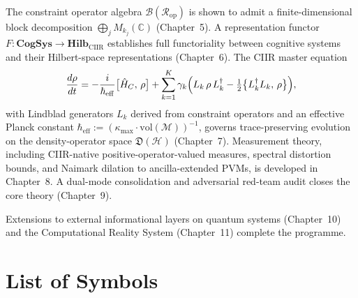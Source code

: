 \documentclass[11pt,a4paper,openany]{book}
\theoremstyle{remark}
\newcommand{\CR}{\mathcal{R}}          %
\newcommand{\CM}{\mathcal{M}}          %
\newcommand{\CB}{\mathcal{B}}          %
\newcommand{\hatH}{\hat{H}}            %
\newcommand{\heff}{\hbar_{\mathrm{eff}}}
\begin{document}
The constraint operator algebra $\CB(\CR_{\mathrm{op}})$ is shown to
admit a finite-dimensional block decomposition
$\bigoplus_j M_{k_j}(\mathbb{C})$ (Chapter~5).  A representation
functor $F : \mathbf{CogSys} \to \mathbf{Hilb}_{\mathrm{CIIR}}$
establishes full functoriality between cognitive systems and their
Hilbert-space representations (Chapter~6).  The CIIR master equation
\[
  \frac{d\rho}{dt}
  = -\frac{i}{\heff}\bigl[\hatH_C,\,\rho\bigr]
    + \sum_{k=1}^{K}\gamma_k
      \Bigl(L_k\,\rho\,L_k^\dagger
            - \tfrac{1}{2}\bigl\{L_k^\dagger L_k,\,\rho\bigr\}\Bigr),
\]
with Lindblad generators $L_k$ derived from constraint operators and
an effective Planck constant $\heff := (\kappa_{\max}\cdot
\mathrm{vol}(\CM))^{-1}$, governs trace-preserving evolution on the
density-operator space $\mathfrak{D}(\mathcal{H})$ (Chapter~7).
Measurement theory, including CIIR-native positive-operator-valued
measures, spectral distortion bounds, and Naimark dilation to
ancilla-extended PVMs, is developed in Chapter~8.  A dual-mode
consolidation and adversarial red-team audit closes the core theory
(Chapter~9).

Extensions to external informational layers on quantum systems
(Chapter~10) and the Computational Reality System (Chapter~11)
complete the programme.

\chapter*{List of Symbols}
\end{document}

